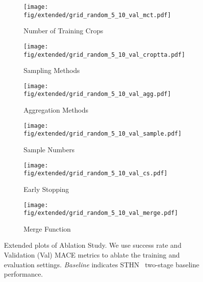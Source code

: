 \begin{figure}[]
\begin{subfigure}[b]{0.33\textwidth}
    \texttt{[image: fig/extended/grid\_random\_5\_10\_val\_mct.pdf]}
    \caption{Number of Training Crops}
    \label{mct}
\end{subfigure}
\begin{subfigure}[b]{0.33\textwidth}
    \texttt{[image: fig/extended/grid\_random\_5\_10\_val\_croptta.pdf]}
    \caption{Sampling Methods}
    \label{croptta}
\end{subfigure}
\begin{subfigure}[b]{0.33\textwidth}
    \texttt{[image: fig/extended/grid\_random\_5\_10\_val\_agg.pdf]}
    \caption{Aggregation Methods}
    \label{agg}
\end{subfigure}
\begin{subfigure}[b]{0.33\textwidth}
    \texttt{[image: fig/extended/grid\_random\_5\_10\_val\_sample.pdf]}
    \caption{Sample Numbers}
    \label{sample}
\end{subfigure}
\begin{subfigure}[b]{0.33\textwidth}
    \texttt{[image: fig/extended/grid\_random\_5\_10\_val\_cs.pdf]}
    \caption{Early Stopping}
    \label{cs}
\end{subfigure}
\begin{subfigure}[b]{0.33\textwidth}
    \texttt{[image: fig/extended/grid\_random\_5\_10\_val\_merge.pdf]}
    \caption{Merge Function}
    \label{merge}
\end{subfigure}
    \caption{Extended plots of Ablation Study. We use success rate and Validation (Val) MACE metrics to ablate the training and evaluation settings. \textit{Baseline} indicates STHN~\cite{STHN} two-stage baseline performance.}
    \label{extended}
    \vspace{-15pt}
\end{figure}